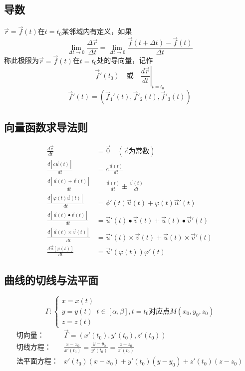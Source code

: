\subsection{导数}
$\overrightarrow{r}=\overrightarrow{f}(t)$在$t=t_0$某邻域内有定义，如果
$$\lim\limits_{\Delta t\to 0}\frac{\Delta\overrightarrow{r}}{\Delta t}=\lim\limits_{\Delta t\to 0}\frac{\overrightarrow{f}(t+\Delta t)-\overrightarrow{f}(t)}{\Delta t}$$
称此极限为$\overrightarrow{r}=\overrightarrow{f}(t)$在$t=t_0$处的导向量，记作
$$\overrightarrow{f}'(t_0)\quad\mbox{或}\quad \left.\frac{d\overrightarrow{r}}{dt}\right|_{t=t_0}$$
$$\overrightarrow{f}'(t)=\left(\overrightarrow{f}_1'(t),\overrightarrow{f}'_2(t),\overrightarrow{f}'_3(t) \right)$$
\subsection{向量函数求导法则}
\begin{align}
	\frac{d\overrightarrow{c}}{dt}&=\overrightarrow{0}\quad(\overrightarrow{c}\mbox{为常数})\\
	\frac{d\left[c\overrightarrow{u}(t)\right]}{dt}&=c\frac{\overrightarrow{u}(t)}{dt}\\
	\frac{d\left[\overrightarrow{u}(t)\pm\overrightarrow{v}(t)\right]}{dt}&=\frac{\overrightarrow{u}(t)}{dt}\pm\frac{\overrightarrow{v}(t)}{dt}\\
	\frac{d\left[\varphi(t)\overrightarrow{u}(t)\right]}{dt}&=\phi'(t)\overrightarrow{u}(t)+\varphi(t)\overrightarrow{u}'(t)\\
	\frac{d\left[\overrightarrow{u}(t)\bullet\overrightarrow{v}(t)\right]}{dt}&=\overrightarrow{u}'(t)\bullet\overrightarrow{v}(t)+\overrightarrow{u}(t)\bullet\overrightarrow{v}'(t)\\
	\frac{d\left[\overrightarrow{u}(t)\times\overrightarrow{v}(t)\right]}{dt}&=\overrightarrow{u}'(t)\times\overrightarrow{v}(t)+\overrightarrow{u}(t)\times\overrightarrow{v}'(t)\\
	\frac{d\overrightarrow{u}[\varphi(t)]}{dt}&=\overrightarrow{u}'(\varphi(t))\varphi'(t)
\end{align}
\subsection{曲线的切线与法平面}
$$\Gamma:\begin{cases}
	x=x(t)\\
	y=y(t)\\
	z=z(t)
\end{cases}t\in[\alpha,\beta],t=t_0\mbox{对应点}M(x_0,y_0,z_0)$$
\begin{align*}
	\mbox{切向量：}&\overrightarrow{\Gamma}=(x'(t_0),y'(t_0),z'(t_0))\\
	\mbox{切线方程：}&\frac{x-x_0}{x'(t_0)}=\frac{y-y_0}{y'(t_0)}=\frac{z-z_0}{z'(t_0)}\\
	\mbox{法平面方程：}&x'(t_0)(x-x_0)+y'(t_0)(y-y_0)+z'(t_0)(z-z_0)
\end{align*}
